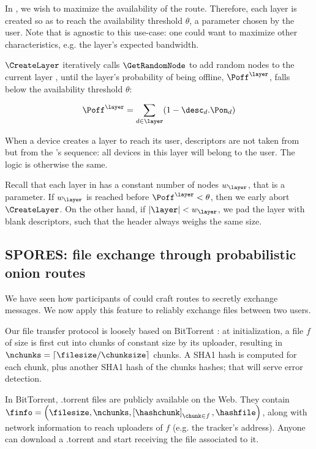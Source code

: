 In \name, we wish to maximize the availability of the route.
Therefore, each layer \layer is created so as to reach the availability threshold $\theta$, a parameter chosen by the user.
Note that \Sphinxes is agnostic to this use-case: one could want to maximize other characteristics, e.g. the layer's expected bandwidth.

$\CreateLayer$ iteratively calls $\GetRandomNode\xspace$ to add random nodes to the current layer \layer, until the layer's probability of being offline, $\Poff^\layer$, falls below the availability threshold $\theta$:

$$ \Poff^\layer = \sum\limits_{d \in \layer}(1 - \desc_d.\Pon_d) $$

When a device creates a layer to reach its user, descriptors are not taken from \rpsview but from the \squad's sequence: all devices in this layer will belong to the user.
The logic is otherwise the same.

Recall that each layer in \Sphinxes has a constant number of nodes $w_\layer$, that is a \Sphinxes parameter.
If $w_\layer$ is reached before $\Poff^\layer < \theta$, then we early abort $\CreateLayer$.
On the other hand, if $|\layer| < w_\layer$, we pad the layer with blank descriptors, such that the header always weighs the same size.


\subsection{SPORES: file exchange through probabilistic onion routes}
\label{ssec:spores_file_exchange_through_probabilistic_onion_routes}


We have seen how participants of \name could craft routes to secretly exchange messages.
We now apply this feature to reliably exchange files between two users.

Our file transfer protocol is loosely based on BitTorrent \cite{bt_bep3}: 
at initialization, a file $f$ of size \filesize is first cut into chunks of constant size \chunksize by its uploader,
resulting in $\nchunks = \lceil \filesize / \chunksize \rceil$ chunks.
A SHA1 hash \hashchunk is computed for each chunk, plus another SHA1 hash \hashfile of the chunks hashes; that will serve error detection. 


In BitTorrent, .torrent files are publicly available on the Web.
They contain $\finfo = \left(\filesize, \nchunks, \left[\hashchunk\right]_{\chunk \in f}, \hashfile\right)$, 
along with network information to reach uploaders of $f$ (e.g. the tracker's address).
Anyone can download a .torrent and start receiving the file associated to it.


